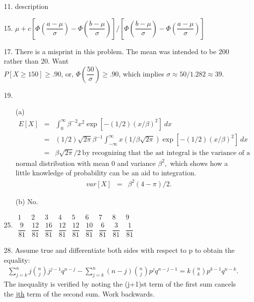 \begin{enumerate}
	\item[11.] description
	
	\item[15.] $\mu + c\left[\Phi\left(\dfrac{a-\mu}{\sigma}\right) - \Phi\left(\dfrac{b-\mu}{\sigma}\right)\right]/\left[\Phi\left(\dfrac{b-\mu}{\sigma}\right) - \Phi\left(\dfrac{a-\mu}{\sigma}\right)\right]$
	
	\item[17.] There is a misprint in this problem.  The mean was intended to be 200 rather than 20.  Want \\
	$P[X \ge 150] \ge .90$, or, $\Phi\left(\dfrac{50}{\sigma}\right) \ge .90$, which implies $\sigma \approx 50/1.282 \approx 39$.
	
	\item[19.] \begin{enumerate}
		\item[(a)] \begin{eqnarray*}
			E[X] &=& \int_{0}^{\infty} \beta^{-2}x^2\exp[-(1/2)(x/\beta)^2]\ dx \\
			&=& (1/2)\sqrt{2\pi}\beta^{-1}\int_{-\infty}^{\infty}x(1/\beta\sqrt{2\pi})\exp[-(1/2)(x/\beta)^2]\ dx \\
			&=& \beta\sqrt{2\pi}/2\ \text{by recognizing that the ast integral is the variance of a} 
		\end{eqnarray*} 
		normal distribution with mean $0$ and variance $\beta^2,$ which shows how a little knowledge of probability can be an aid to integration.
		\begin{eqnarray*}
		var[X] &=& \beta^2(4-\pi)/2.
		\end{eqnarray*}
	
		\item[(b)] No.	
	\end{enumerate}

	\item[25.] $\begin{array}{c|c|c|c|c|c|c|c|c}
		1 & 2 & 3 & 4 & 5 & 6 & 7 & 8 & 9 \\ \hline
		\dfrac{9}{81} & \dfrac{12}{81} & \dfrac{16}{81}& \dfrac{12}{81}& \dfrac{12}{81} & \dfrac{10}{81}& \dfrac{6}{81}& \dfrac{3}{81}& \dfrac{1}{81}
	\end{array}$
	
	\item[28.] Assume true and differentiate both sides with respect to p to obtain the equality:
	\begin{eqnarray*}
	\sum_{j=k}^{n} j{n\choose j}j^{j-1}q^{n-j} - \sum_{j=k}^{n}(n-j){n\choose j}p^jq^{n-j-1} = k{n\choose k}p^{k-1}q^{n-k}.
	\end{eqnarray*} 
	The inequality is verified by noting the (j+1)st term of the first sum cancels the j\underline{th} term of the second sum.  Work backwards.
	

\end{enumerate}
